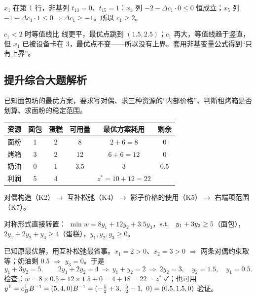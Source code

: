 \SolHead{$[2,+\infty)$}{中等偏下}{K8 基变量的价值系数}
$x_1$ 在第 1 行，非基列 $t_{13}=0$、$t_{15}=1$：$x_3$ 列 $-2-\Delta c_1\cdot0\le0$ 恒成立；$x_5$ 列 $-1-\Delta c_1\cdot1\le0\Rightarrow\Delta c_1\ge-1$。所以 $c_1\ge2$。
\begin{figure}[!htbp]\centering
{}
\end{figure}
$c_1<2$ 时等值线比  线更平，最优点跳到 $(1.5,2.5)$；$c_1$ 再大，等值线趋于竖直，但 $x_1$ 已被设备卡在 3，最优点不变——所以没有上界。\quad{}套用非基变量公式得到“只有上界”。

\subsection*{提升综合大题解析}

已知面包坊的最优方案，要求写对偶、求三种资源的“内部价格”、判断租烤箱是否划算、求面粉的稳定范围。\par
{}
\begin{center}\small
\begin{tabular}{@{}lccccc@{}}\toprule
资源 & 面包 & 蛋糕 & 可用量 & 最优方案耗用 & 剩余\\\midrule
面粉 & 1 & 2 & 8 & $2+6=8$ & 0\\
烤箱 & 3 & 2 & 12 & $6+6=12$ & 0\\
奶油 & 0 & 1 & 3.5 & 3 & 0.5\\\midrule
利润 & 5 & 4 & & $z^*=10+12=22$ & \\\bottomrule
\end{tabular}
\end{center}
对偶构造（K2）$\to$ 互补松弛（K4）$\to$ 影子价格的使用（K5）$\to$ 右端项范围（K7）。

对称形式直接转置：
$\min w=8y_1+12y_2+3.5y_3$，$\text{s.t.}\quad y_1+3y_2\ge5$（面包），$2y_1+2y_2+y_3\ge4$（蛋糕），$y_1,y_2,y_3\ge0$。

已知原最优解，用互补松弛最省事。$x_1=2>0$、$x_2=3>0$ $\Rightarrow$ 两条对偶约束取等；奶油剩 0.5 $\Rightarrow$ $y_3=0$。于是
\[
y_1+3y_2=5,\qquad 2y_1+2y_2=4\ \Rightarrow\ y_1+y_2=2\ \Rightarrow\ 2y_2=3,\quad y_2=1.5,\quad y_1=0.5 .
\]
检查：$w=8\times0.5+12\times1.5+0=4+18=22=z^*$ ✓；也可用 $y^{\mathsf T}=c_B^{\mathsf T} B^{-1}=(5,4,0)B^{-1}=(-\frac52+3,\ \frac52-1,\ 0)=(0.5,1.5,0)$ 验证。

